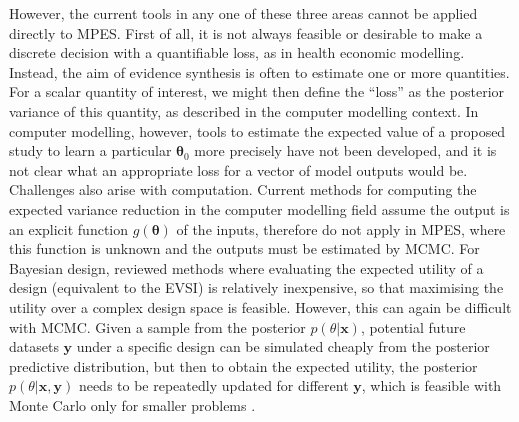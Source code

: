 \documentclass[12pt]{article}\usepackage[]{graphicx}\usepackage[]{color}
\newcommand{\y}{\mathbf{y}}
\newcommand{\x}{\mathbf{x}}
\begin{document}
However, the current tools in any one of these three areas cannot be applied directly to MPES.  First of all, it is not always feasible or desirable to make a discrete decision with a quantifiable loss, as in health economic modelling.  Instead, the aim of evidence synthesis is often to estimate one or more quantities.  For a scalar quantity of interest, we might then define the ``loss'' as the posterior variance of this quantity, as \citet{oakley:ohagan:psa} described in the computer modelling context.  In computer modelling, however, tools to estimate the expected value of a proposed study to learn a particular $\bm\theta_0$ more precisely have not been developed, and it is not clear what an appropriate loss for a vector of model outputs would be.  Challenges also arise with computation.  Current methods for computing the expected variance reduction in the computer modelling field \citep{sobol2001global,saltelli2004sensitivity} assume the output is an explicit function $g(\bm\theta)$ of the inputs, therefore do not apply in MPES, where this function is unknown and the outputs must be estimated by MCMC.  For Bayesian design, \citet{ryan2015review} reviewed methods where evaluating the expected utility of a design (equivalent to the EVSI) is relatively inexpensive, so that maximising the utility over a complex design space is feasible.  However, this can again be difficult with MCMC.  Given a sample from the posterior $p(\theta|\x)$, potential future datasets $\y$ under a specific design can be simulated cheaply from the posterior predictive distribution, but then to obtain the expected utility, the posterior $p(\theta|\x,\y)$ needs to be repeatedly updated for different $\y$, which is feasible with Monte Carlo only for smaller problems \citep[e.g.][]{han2004bayesian}.
\end{document}
